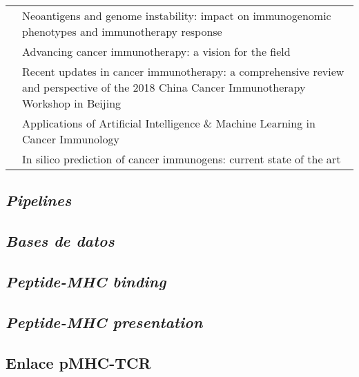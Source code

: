 \begin{table}[H]
\begin{tabular}{p{3cm}p{10cm}}
		\cite{mardis2019neoantigens}          & Neoantigens and genome instability: impact on immunogenomic phenotypes and immunotherapy response                                         \\
		\cite{de2019advancing}                & Advancing cancer immunotherapy: a vision for the field                                                                                    \\
		\cite{li2018recent}                   & Recent updates in cancer immunotherapy: a comprehensive review and perspective of the 2018 China Cancer Immunotherapy Workshop in Beijing \\
		\cite{sidhom2018applications}         & Applications of Artificial Intelligence \& Machine Learning in Cancer Immunology                                                          \\
		\cite{doytchinova2018silico}          & In silico prediction of cancer immunogens: current state of the art                                                                      
	\end{tabular}
\end{table}



\subsection{\textit{Pipelines}}

\subsection{\textit{Bases de datos}}

\subsection{\textit{Peptide-MHC binding}}

\subsection{\textit{Peptide-MHC presentation}}

\subsection{Enlace pMHC-TCR}


